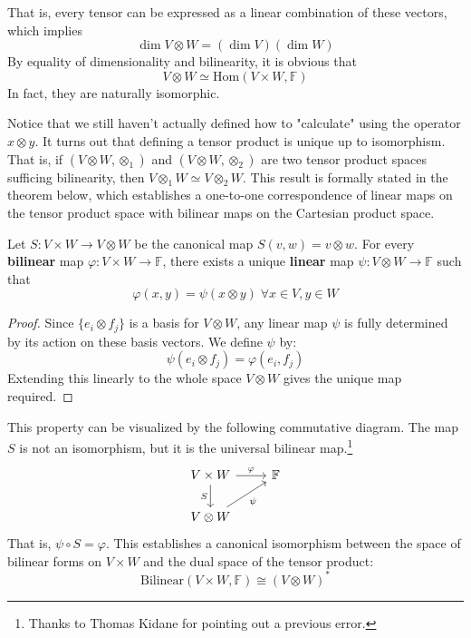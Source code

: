   That is, every tensor can be expressed as a linear combination of these vectors, which implies
  \[\dim{V \otimes W} = (\dim{V}) (\dim{W})\]
  By equality of dimensionality and bilinearity, it is obvious that
  \[V \otimes W \simeq \text{Hom}(V \times W, \mathbb{F})\]
  In fact, they are naturally isomorphic. 

  Notice that we still haven't actually defined how to "calculate" using the operator $x \otimes y$. It turns out that defining a tensor product is unique up to isomorphism. That is, if $(V \otimes W, \otimes_1)$ and $(V \otimes W, \otimes_2)$ are two tensor product spaces sufficing bilinearity, then $V \otimes_1 W \simeq V \otimes_2 W$. This result is formally stated in the theorem below, which establishes a one-to-one correspondence of linear maps on the tensor product space with bilinear maps on the Cartesian product space. 

  \begin{theorem}
    Let $S: V \times W \to V \otimes W$ be the canonical map $S(v, w) = v \otimes w$. For every \textbf{bilinear} map $\varphi: V \times W \longrightarrow \mathbb{F}$, there exists a unique \textbf{linear} map $\psi: V \otimes W \longrightarrow \mathbb{F}$ such that 
    \[\varphi (x, y) = \psi (x \otimes y) \; \forall x \in V, y \in W\]
  \end{theorem}
  \begin{proof}
    Since $\{e_i \otimes f_j\}$ is a basis for $V \otimes W$, any linear map $\psi$ is fully determined by its action on these basis vectors. We define $\psi$ by:
    \[\psi (e_i \otimes f_j) = \varphi (e_i, f_j)\]
    Extending this linearly to the whole space $V \otimes W$ gives the unique map required.
  \end{proof}

  This property can be visualized by the following commutative diagram. The map $S$ is not an isomorphism, but it is the universal bilinear map.\footnote{Thanks to Thomas Kidane for pointing out a previous error.}
  \[\begin{tikzcd}
      V \times W \arrow[r, "\varphi"] \arrow[d, "S"'] & \mathbb{F} \\
      V \otimes W \arrow[ru, "\psi"']
  \end{tikzcd}\]
  That is, $\psi \circ S = \varphi$. This establishes a canonical isomorphism between the space of bilinear forms on $V \times W$ and the dual space of the tensor product:
  \[ \text{Bilinear}(V \times W, \mathbb{F}) \cong (V \otimes W)^* \]

